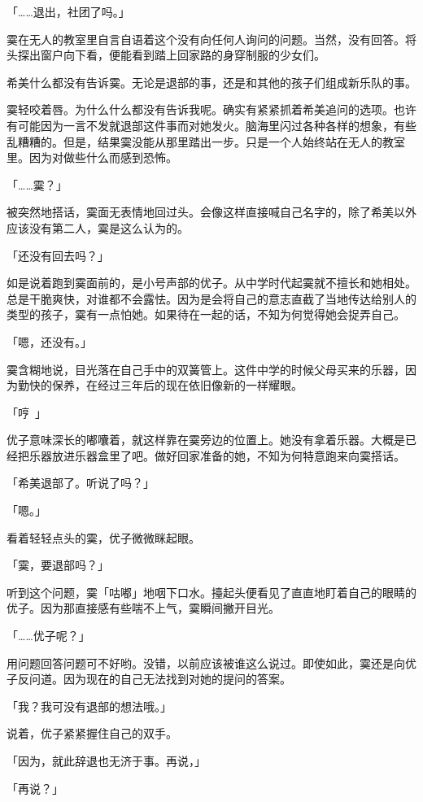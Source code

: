 \documentclass[UTF8]{ctexart}
\begin{document}
    「……退出，社团了吗。」

    霙在无人的教室里自言自语着这个没有向任何人询问的问题。当然，没有回答。将头探出窗户向下看，便能看到踏上回家路的身穿制服的少女们。

    希美什么都没有告诉霙。无论是退部的事，还是和其他的孩子们组成新乐队的事。

    霙轻咬着唇。为什么什么都没有告诉我呢。确实有紧紧抓着希美追问的选项。也许有可能因为一言不发就退部这件事而对她发火。脑海里闪过各种各样的想象，有些乱糟糟的。但是，结果霙没能从那里踏出一步。只是一个人始终站在无人的教室里。因为对做些什么而感到恐怖。

    「……霙？」

    被突然地搭话，霙面无表情地回过头。会像这样直接喊自己名字的，除了希美以外应该没有第二人，霙是这么认为的。

    「还没有回去吗？」

    如是说着跑到霙面前的，是小号声部的优子。从中学时代起霙就不擅长和她相处。总是干脆爽快，对谁都不会露怯。因为是会将自己的意志直截了当地传达给别人的类型的孩子，霙有一点怕她。如果待在一起的话，不知为何觉得她会捉弄自己。

    「嗯，还没有。」

    霙含糊地说，目光落在自己手中的双簧管上。这件中学的时候父母买来的乐器，因为勤快的保养，在经过三年后的现在依旧像新的一样耀眼。

    「哼~」

    优子意味深长的嘟囔着，就这样靠在霙旁边的位置上。她没有拿着乐器。大概是已经把乐器放进乐器盒里了吧。做好回家准备的她，不知为何特意跑来向霙搭话。

    「希美退部了。听说了吗？」

    「嗯。」

    看着轻轻点头的霙，优子微微眯起眼。

    「霙，要退部吗？」

    听到这个问题，霙「咕嘟」地咽下口水。擡起头便看见了直直地盯着自己的眼睛的优子。因为那直接感有些喘不上气，霙瞬间撇开目光。

    「……优子呢？」

    用问题回答问题可不好哟。没错，以前应该被谁这么说过。即使如此，霙还是向优子反问道。因为现在的自己无法找到对她的提问的答案。

    「我？我可没有退部的想法哦。」

    说着，优子紧紧握住自己的双手。

    「因为，就此辞退也无济于事。再说，」

    「再说？」
\end{document}
